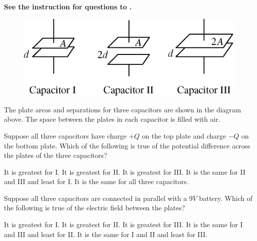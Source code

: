 \textbf{See the instruction for questions  to .}

\begin{figure}[H]
    \center
    \includegraphics[scale=0.25]{images/img-005-012.png}
\end{figure}

The plate areas and separations for three capacitors are shown in the diagram above. The space between the plates in each capacitor is filled with air.

\begin{questions}\setcounter{question}{9}\question
Suppose all three capacitors have charge $+Q$ on the top plate and charge $-Q$ on the bottom plate. Which of the following is true of the potential difference across the plates of the three capacitors?

\begin{choices}
\choice It is greatest for I.
\choice It is greatest for II.
\choice It is greatest for III.
\choice It is the same for II and III and least for I.
\choice It is the same for all three capacitors.
\end{choices}\end{questions}

\begin{questions}\setcounter{question}{10}\question
Suppose all three capacitors are connected in parallel with a $9\unit{V}$ battery. Which of the following is true of the electric field between the plates?

\begin{choices}
\choice It is greatest for I.
\choice It is greatest for II.
\choice It is greatest for III.
\choice It is the same for I and III and least for II.
\choice It is the same for I and II and least for III.
\end{choices}\end{questions}

